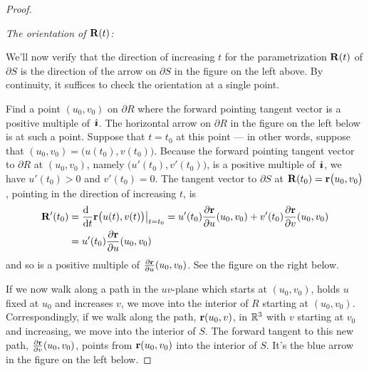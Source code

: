 \begin{proof}
{\begin{efig}
\begin{center}
\end{center}
\end{efig}
}

\noindent
\emph{The orientation of $\mathbf{R}(t)$:}\ \ \

We'll now verify that the direction of increasing $t$ for the parametrization 
$\mathbf{R}(t)$ of $\partial S$ is the direction of the arrow on $\partial S$ 
in the figure on the left above.
By continuity, it suffices to check the orientation at a single point.

Find a point $(u_0,v_0)$ on $\partial R$ where the forward pointing 
tangent vector is a positive multiple of $\,\hat{\pmb{\imath}}$. The horizontal 
arrow on $\partial R$ 
in the figure on the left below is at such a point. Suppose that 
$t=t_0$ at this point --- in other words, suppose 
that $(u_0,v_0)=\big(u(t_0),v(t_0)\big)$. 
Because  the forward pointing tangent vector to $\partial R$ at 
$(u_0,v_0)$, namely $\big(u'(t_0),v'(t_0)\big)$,
 is a positive multiple of $\,\hat{\pmb{\imath}}$, we have $u'(t_0)>0$ and 
$v'(t_0)=0$. 
The tangent vector to $\partial S$ at $ \mathbf{R}(t_0)=\mathbf{r}\big(u_0,v_0\big)$,
pointing in the direction of increasing $t$, is 
\begin{align*}
\vR'(t_0)&=\diff{\hfill}{t}\vr\big(u(t),v(t)\big)\big|_{t=t_0}
=u'(t_0)\frac{\partial \vr}{\partial u}(u_0,v_0)
+v'(t_0) \frac{\partial \vr}{\partial v}(u_0,v_0) \\
&=u'(t_0)\frac{\partial \vr}{\partial u}(u_0,v_0)
\end{align*}
and so is a positive multiple of $\frac{\partial \mathbf{r}}{\partial u}(u_0,v_0)$.
See the figure on the right below.
 
If we now walk along a path in the $uv$-plane which starts at $(u_0,v_0)$,
holds $u$ fixed at $u_0$ and increases $v$, we move into the interior of 
$R$ starting at $(u_0,v_0)$. Correspondingly, if we walk along the path,
$\mathbf{r}(u_0,v)$, in $\mathbb{R}^3$ with $v$ starting at $v_0$ and increasing,
we move into the interior of $S$. The forward tangent to this new path, 
$\frac{\partial \mathbf{r}}{\partial v}(u_0,v_0)$,
points from $ \mathbf{r}(u_0,v_0)$ into the interior of $S$. It's the blue arrow in
the figure on the left below.


\end{proof}
